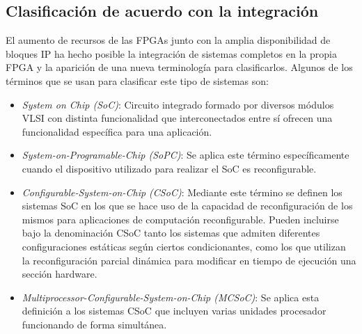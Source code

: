 \subsection{Clasificación de acuerdo con la integración}

El aumento de recursos de las FPGAs junto con la amplia disponibilidad
de bloques IP ha hecho posible la integración de sistemas completos en
la propia FPGA y la aparición de una nueva terminología para
clasificarlos. Algunos de los términos que se usan para clasificar
este tipo de sistemas son:

\begin {itemize}
\item \textit{System on Chip (SoC)}: Circuito integrado formado por
  diversos módulos VLSI con distinta funcionalidad que interconectados
  entre sí ofrecen una funcionalidad específica para una aplicación.
\item \textit{System-on-Programable-Chip (SoPC)}: Se aplica este
  término específicamente cuando el dispositivo utilizado para
  realizar el SoC es reconfigurable.
\item \textit{Configurable-System-on-Chip (CSoC)}: Mediante este
  término se definen los sistemas SoC en los que se hace uso de la
  capacidad de reconfiguración de los mismos para aplicaciones de
  computación reconfigurable. Pueden incluirse bajo la denominación
  CSoC tanto los sistemas que admiten diferentes configuraciones
  estáticas según ciertos condicionantes, como los que utilizan la
  reconfiguración parcial dinámica para modificar en tiempo de
  ejecución una sección hardware.
\item \textit{Multiprocessor-Configurable-System-on-Chip (MCSoC)}: Se
  aplica esta definición a los sistemas CSoC que incluyen varias
  unidades procesador funcionando de forma simultánea.
\end {itemize}

